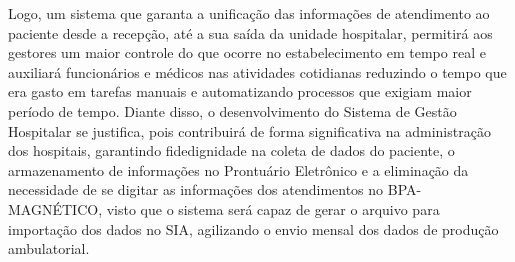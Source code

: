 Logo, um sistema que garanta a unificação das informações de atendimento ao paciente desde a recepção, até a sua saída da unidade hospitalar, permitirá aos gestores um maior controle do que ocorre no estabelecimento em tempo real e auxiliará funcionários e médicos nas atividades cotidianas reduzindo o tempo que era gasto em tarefas manuais e automatizando processos que exigiam maior período de tempo.
Diante disso, o desenvolvimento do Sistema de Gestão Hospitalar se justifica, pois contribuirá de forma significativa na administração dos hospitais, garantindo fidedignidade na coleta de dados do paciente, o armazenamento de informações no Prontuário Eletrônico e a eliminação da necessidade de se digitar as informações dos atendimentos no BPA-MAGNÉTICO, visto que o sistema será capaz de gerar o arquivo para importação dos dados no SIA, agilizando o envio mensal dos dados de produção ambulatorial.


